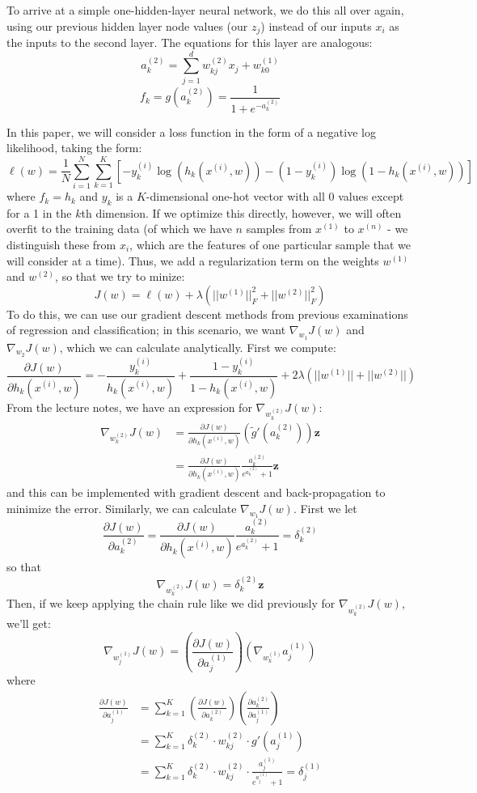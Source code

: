 \documentclass[11pt,letterpaper]{article}
\begin{document}
To arrive at a simple one-hidden-layer neural network, we do this all over again, using our previous hidden layer node values (our $z_j$) instead of our inputs $x_i$ as the inputs to the second layer. The equations for this layer are analogous:
$$a_k^{(2)} = \sum_{j=1}^d w_{kj}^{(2)}x_j+w_{k0}^{(1)}$$
$$f_k = g(a_k^{(2)}) = \frac{1}{1 + e^{-a_k^{(2)}}}$$

In this paper, we will consider a loss function in the form of a negative log likelihood, taking the form:
$$\ell(w) = \frac{1}{N}\sum_{i=1}^N\sum_{k=1}^K\left[-y_k^{(i)}\log(h_k(x^{(i)},w))-(1-y_k^{(i)})\log(1-h_k(x^{(i)},w))\right]$$
where $f_k=h_k$ and $y_k$ is a $K$-dimensional one-hot vector with all 0 values except for a 1 in the $k$th dimension. If we optimize this directly, however, we will often overfit to the training data (of which we have $n$ samples from $x^{(1)}$ to $x^{(n)}$ - we distinguish these from $x_i$, which are the features of one particular sample that we will consider at a time). Thus, we add a regularization term on the weights $w^{(1)}$ and $w^{(2)}$, so that we try to minize:
$$J(w) = \ell(w)+\lambda(||w^{(1)}||_F^2+||w^{(2)}||_F^2)$$
To do this, we can use our gradient descent methods from previous examinations of regression and classification; in this scenario, we want $\nabla_{w_1}J(w)$ and $\nabla_{w_2}J(w)$, which we can calculate analytically. First we compute:
$$\frac{\partial J(w)}{\partial h_k(x^{(i)},w)}=-\frac{y_k^{(i)}}{h_k(x^{(i)},w)}+\frac{1-y_k^{(i)}}{1-h_k(x^{(i)},w)}+2\lambda(||w^{(1)}||+||w^{(2)}||)$$
From the lecture notes, we have an expression for $\nabla_{w^{(2)}_k}J(w)$:
\begin{align*}
\nabla_{w^{(2)}_k}J(w)&=\frac{\partial J(w)}{\partial h_k(x^{(i)},w)}(\tilde{g}'(a_k^{(2)}))\textbf{z}\\
&=\frac{\partial J(w)}{\partial h_k(x^{(i)},w)}\frac{a_k^{(2)}}{e^{a_k^{(2)}}+1}\textbf{z}
\end{align*}
and this can be implemented with gradient descent and back-propagation to minimize the error. Similarly, we can calculate $\nabla_{w_1}J(w)$. First we let
$$\frac{\partial J(w)}{\partial a_k^{(2)}}=\frac{\partial J(w)}{\partial h_k(x^{(i)},w)}\frac{a_k^{(2)}}{e^{a_k^{(2)}}+1}=\delta_k^{(2)}$$
so that
$$\nabla_{w^{(2)}_k}J(w)=\delta_k^{(2)}\textbf{z}$$
Then, if we keep applying the chain rule like we did previously for $\nabla_{w^{(2)}_k}J(w)$, we'll get:
$$\nabla_{w^{(1)}_j}J(w)=\left(\frac{\partial J(w)}{\partial a_j^{(1)}}\right)\left(\nabla_{w^{(1)}_k}a_j^{(1)}\right)$$
where
\begin{align*}
\frac{\partial J(w)}{\partial a_j^{(1)}}&=\sum_{k=1}^K\left(\frac{\partial J(w)}{\partial a_k^{(2)}}\right)\left(\frac{\partial a_k^{(2)}}{\partial a_j^{(1)}}\right)\\
&=\sum_{k=1}^K\delta_k^{(2)}\cdot w_{kj}^{(2)}\cdot g'(a_j^{(1)})\\
&=\sum_{k=1}^K\delta_k^{(2)}\cdot w_{kj}^{(2)}\cdot \frac{a_j^{(1)}}{e^{a_j^{(1)}}+1} = \delta_j^{(1)}
\end{align*}
\end{document}

